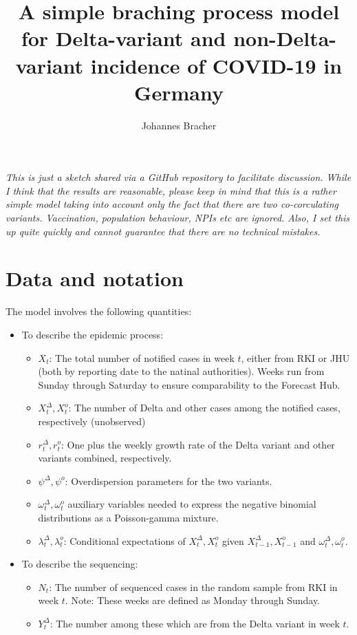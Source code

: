 \documentclass{article}
\begin{document}
\title{A simple braching process model for Delta-variant and non-Delta-variant incidence of COVID-19 in Germany}
\author{Johannes Bracher}


\maketitle
\bigskip

\textit{This is just a sketch shared via a GitHub repository to facilitate discussion. While I think that the results are reasonable, please keep in mind that this is a rather simple model taking into account only the fact that there are two co-corculating variants. Vaccination, population behaviour, NPIs etc are ignored. Also, I set this up quite quickly and cannot guarantee that there are no technical mistakes.}

\section{Data and notation}

The model involves the following quantities:

\begin{itemize}
\item To describe the epidemic process:
\begin{itemize}
\item $X_t$: The total number of notified cases in week $t$, either from RKI or JHU (both by reporting date to the natinal authorities). Weeks run from Sunday through Saturday to ensure comparability to the Forecast Hub.
\item $X^\Delta_t, X^o_t$: The number of Delta and other cases among the notified cases, respectively (unobserved)
\item $r^\Delta_t, r^o_t$: One plus the weekly growth rate of the Delta variant and other variants combined, respectively.
\item $\psi^\Delta, \psi^o$: Overdispersion parameters for the two variants.
\item $\omega^\Delta_t, \omega^o_t$ auxiliary variables needed to express the negative binomial distributions as a Poisson-gamma mixture.
\item $\lambda^\Delta_t, \lambda^o_t$: Conditional expectations of $X^\Delta_t, X^o_t$ given $X^\Delta_{t - 1}, X^o_{t - 1}$ and $\omega^\Delta_t, \omega^o_t$.
\end{itemize}
\item To describe the sequencing:
\begin{itemize}
\item $N_t$: The number of sequenced cases in the random sample from RKI in week $t$. Note: These weeks are defined as Monday through Sunday.
\item $Y^\Delta_t$: The number among these which are from the Delta variant in week $t$.
\end{itemize}
\end{itemize}
\end{document}
